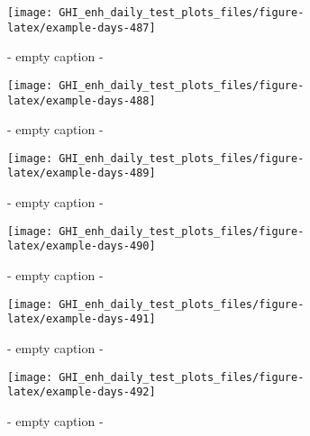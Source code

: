 \documentclass[
  10pt,
  a4paper,oneside]{article}
\begin{document}
\begin{figure}[H]

{\centering \texttt{[image: GHI\_enh\_daily\_test\_plots\_files/figure-latex/example-days-487]} 

}

\caption{ - empty caption - }\label{fig:example-days-487}
\end{figure}

\begin{figure}[H]

{\centering \texttt{[image: GHI\_enh\_daily\_test\_plots\_files/figure-latex/example-days-488]} 

}

\caption{ - empty caption - }\label{fig:example-days-488}
\end{figure}

\begin{figure}[H]

{\centering \texttt{[image: GHI\_enh\_daily\_test\_plots\_files/figure-latex/example-days-489]} 

}

\caption{ - empty caption - }\label{fig:example-days-489}
\end{figure}

\begin{figure}[H]

{\centering \texttt{[image: GHI\_enh\_daily\_test\_plots\_files/figure-latex/example-days-490]} 

}

\caption{ - empty caption - }\label{fig:example-days-490}
\end{figure}

\begin{figure}[H]

{\centering \texttt{[image: GHI\_enh\_daily\_test\_plots\_files/figure-latex/example-days-491]} 

}

\caption{ - empty caption - }\label{fig:example-days-491}
\end{figure}

\begin{figure}[H]

{\centering \texttt{[image: GHI\_enh\_daily\_test\_plots\_files/figure-latex/example-days-492]} 

}

\caption{ - empty caption - }\label{fig:example-days-492}
\end{figure}
\end{document}
